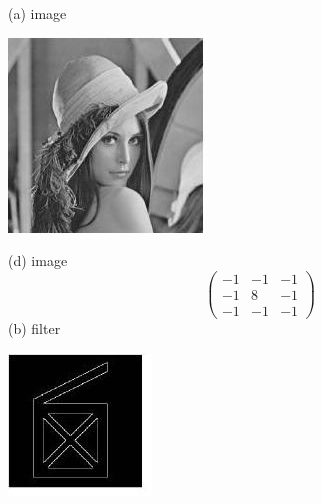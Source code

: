 \documentclass[10pt]{article}
\begin{document}
(a) image

\includegraphics[max width=\textwidth]{2022_01_06_b5ce182ed1bd5f482e5bg-13(1)}

(d) image
$$
\left(\begin{array}{ccc}
-1 & -1 & -1 \\
-1 & 8 & -1 \\
-1 & -1 & -1
\end{array}\right)
$$
(b) filter

\includegraphics[max width=\textwidth]{2022_01_06_b5ce182ed1bd5f482e5bg-13(2)}
\end{document}
